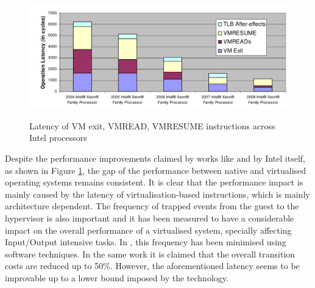 
\begin{figure}[!htbp] 
\begin{center}
\includegraphics[scale=0.27]{images/intel_latency}
\caption{{Latency of VM exit, VMREAD, VMRESUME instructions across Intel processors}}
\vspace{0.1cm}
\label{intel_latency}
\end{center}
\end{figure}


Despite the performance improvements claimed by works like \cite{rearch, avoidvmexit} and by Intel itself, as shown in Figure \ref{intel_latency}, the gap of the performance between native and virtualised operating systems remains consistent.  
It is clear that the performance impact is mainly caused by the latency of virtualisation-based instructions, which is mainly architecture dependent. The frequency of trapped events from the guest to the hypervisor is also important and it has been measured to have a considerable impact on the overall performance of a virtualised system, specially affecting Input/Output intensive tasks. In \cite{avoidvmexit}, this frequency has been minimised using software techniques. In the same work it is claimed that the overall transition costs are reduced up to 50\%. However, the aforementioned latency seems to be improvable up to a lower bound imposed by the technology. %


